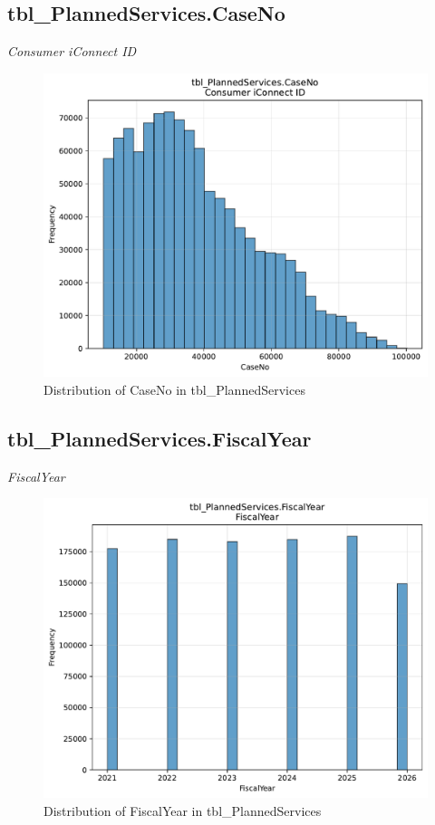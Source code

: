 \subsection{tbl\_PlannedServices.CaseNo}
\textit{Consumer iConnect ID}

\begin{figure}[htbp]
\centering
\includegraphics[width=\textwidth]{figures/dbo_tbl_PlannedServices_CaseNo.pdf}
\caption{Distribution of CaseNo in tbl\_PlannedServices}
\end{figure}\newpage

\subsection{tbl\_PlannedServices.FiscalYear}
\textit{FiscalYear}

\begin{figure}[htbp]
\centering
\includegraphics[width=\textwidth]{figures/dbo_tbl_PlannedServices_FiscalYear.pdf}
\caption{Distribution of FiscalYear in tbl\_PlannedServices}
\end{figure}\newpage

